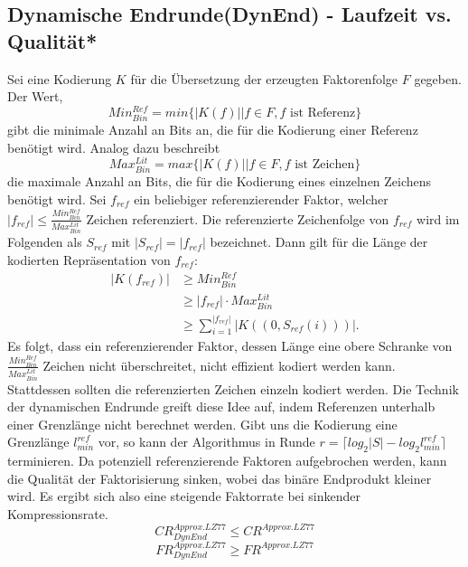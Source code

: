 \subsection{Dynamische Endrunde(DynEnd) - Laufzeit vs. Qualität*}
Sei eine Kodierung $K$ für die Übersetzung der erzeugten Faktorenfolge $F$ gegeben. Der Wert,
\begin{equation}
    Min^{Ref}_{Bin}=min\{|K(f)| | f \in F ,f \text{ ist Referenz}\}
\end{equation}
gibt die minimale Anzahl an Bits an, die für die Kodierung einer Referenz benötigt wird. Analog dazu beschreibt
\begin{equation}
    Max^{Lit}_{Bin}=max\{|K(f)| | f \in F, f \text{ ist Zeichen}\}
\end{equation}
die maximale Anzahl an Bits, die für die Kodierung eines einzelnen Zeichens benötigt wird. Sei $f_{ref}$ ein beliebiger referenzierender Faktor, welcher 
$|f_{ref}|\leq\frac{Min^{Ref}_{Bin}}{Max^{Lit}_{Bin}}$ Zeichen referenziert. Die referenzierte Zeichenfolge von $f_{ref}$ wird im Folgenden als $S_{ref}$ mit $|S_{ref}|=|f_{ref}|$ bezeichnet.
Dann gilt für die Länge der kodierten Repräsentation von $f_{ref}$:
\begin{equation}
\begin{split}
    |K(f_{ref})| & \geq Min^{Ref}_{Bin}\\
    & \geq |f_{ref}| \cdot Max^{Lit}_{Bin}\\
    & \geq \sum_{i=1}^{|f_{ref}|} |K((0, S_{ref}(i)))|.
\end{split}
\end{equation}
Es folgt, dass ein referenzierender Faktor, dessen Länge eine obere Schranke von $\frac{Min^{Ref}_{Bin}}{Max^{Lit}_{Bin}}$ Zeichen nicht überschreitet, nicht effizient kodiert werden kann.
Stattdessen sollten die referenzierten Zeichen einzeln kodiert werden. Die Technik der dynamischen Endrunde greift diese Idee auf, indem Referenzen unterhalb einer Grenzlänge nicht berechnet
werden. Gibt uns die Kodierung eine Grenzlänge $l^{ref}_{min}$ vor, so kann der Algorithmus in Runde $r = \lceil log_2{|S|}-log_2{l^{ref}_{min}} \rceil$ terminieren. Da potenziell 
referenzierende Faktoren aufgebrochen werden, kann die Qualität der Faktorisierung sinken, wobei das binäre Endprodukt kleiner wird. Es ergibt sich also eine steigende Faktorrate bei
sinkender Kompressionsrate.
\begin{equation}
    CR^{Approx.LZ77}_{DynEnd} \leq CR^{Approx.LZ77}
\end{equation}
\begin{equation}
    FR^{Approx.LZ77}_{DynEnd} \geq FR^{Approx.LZ77}
\end{equation}

